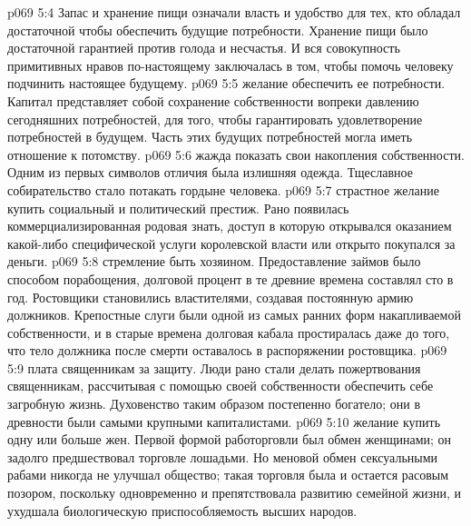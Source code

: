 \vs p069 5:4 \bibnobreakspace {} Запас и хранение пищи означали власть и удобство для тех, кто обладал достаточной  чтобы обеспечить будущие потребности. Хранение пищи было достаточной гарантией против голода и несчастья. И вся совокупность примитивных нравов по\hyp{}настоящему заключалась в том, чтобы помочь человеку подчинить настоящее будущему.
\vs p069 5:5 \pc {}\bibnobreakspace {} желание обеспечить ее потребности. Капитал представляет собой сохранение собственности вопреки давлению сегодняшних потребностей, для того, чтобы гарантировать удовлетворение потребностей в будущем. Часть этих будущих потребностей могла иметь отношение к потомству.
\vs p069 5:6 \pc {}\bibnobreakspace {} жажда показать свои накопления собственности. Одним из первых символов отличия была излишняя одежда. Тщеславное собирательство стало потакать гордыне человека.
\vs p069 5:7 \pc {}\bibnobreakspace {} страстное желание купить социальный и политический престиж. Рано появилась коммерциализированная родовая знать, доступ в которую открывался оказанием какой\hyp{}либо специфической услуги королевской власти или открыто покупался за деньги.
\vs p069 5:8 \pc {}\bibnobreakspace {} стремление быть хозяином. Предоставление займов было способом порабощения, долговой процент в те древние времена составлял сто в год. Ростовщики становились властителями, создавая постоянную армию должников. Крепостные слуги были одной из самых ранних форм накапливаемой собственности, и в старые времена долговая кабала простиралась даже до того, что тело должника после смерти оставалось в распоряжении ростовщика.
\vs p069 5:9 \pc {}\bibnobreakspace {} плата священникам за защиту. Люди рано стали делать пожертвования священникам, рассчитывая с помощью своей собственности обеспечить себе загробную жизнь. Духовенство таким образом постепенно богатело; они в древности были самыми крупными капиталистами.
\vs p069 5:10 \pc {}\bibnobreakspace {} желание купить одну или больше жен. Первой формой работорговли был обмен женщинами; он задолго предшествовал торговле лошадьми. Но меновой обмен сексуальными рабами никогда не улучшал общество; такая торговля была и остается расовым позором, поскольку одновременно и препятствовала развитию семейной жизни, и ухудшала биологическую приспособляемость высших народов.
